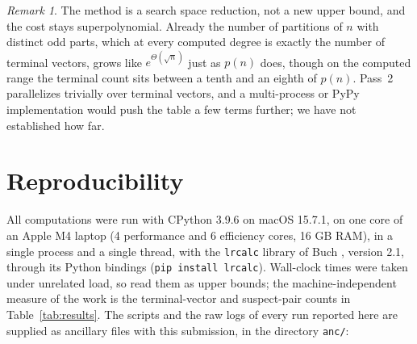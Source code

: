 \documentclass[11pt]{article}
\theoremstyle{remark}
\newtheorem{remark}[theorem]{Remark}
\begin{document}
\begin{remark}
The method is a search space reduction, not a new upper bound, and the cost stays
superpolynomial. Already the number of partitions of $n$ with distinct odd parts, which
at every computed degree is exactly the number of terminal vectors, grows like
$e^{\Theta(\sqrt n)}$ just as
$p(n)$ does, though on the computed range the terminal count sits between a tenth and an
eighth of $p(n)$. Pass~2 parallelizes
trivially over terminal vectors, and a multi-process or PyPy implementation would push
the table a few terms further; we have not established how far.
\end{remark}

\section{Reproducibility}\label{sec:repro}

All computations were run with CPython 3.9.6 on macOS 15.7.1, on one core of an Apple
M4 laptop (4 performance and 6 efficiency cores, 16 GB RAM), in a single process and a
single thread, with the \texttt{lrcalc} library of
Buch \cite{lrcalc}, version 2.1, through its Python bindings (\texttt{pip install
lrcalc}). Wall-clock times were taken under unrelated load, so read them as upper
bounds; the
machine-independent measure of the work is the terminal-vector and suspect-pair counts
in Table~\ref{tab:results}. The scripts and the raw logs of every run reported here are supplied as
ancillary files with this submission, in the directory \texttt{anc/}:
\end{document}
